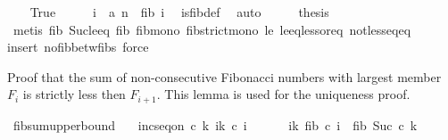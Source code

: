 \begin{isabellebody}
\ \ \isamarkupfalse%
\ True\isanewline
\ \ \isamarkupfalse%
\ \isamarkupfalse%
\ i\ \ a{\isacharcolon}{\kern0pt}\ {\isachardoublequoteopen}n\ {\isacharequal}{\kern0pt}\ fib\ i{\isachardoublequoteclose}\ \isamarkupfalse%
\ is{\isacharunderscore}{\kern0pt}fib{\isacharunderscore}{\kern0pt}def\ \isamarkupfalse%
\ auto\isanewline
\ \ \isamarkupfalse%
\ \isamarkupfalse%
\ {\isacharquery}{\kern0pt}thesis\isanewline
\ \ \ \ \isamarkupfalse%
\ {\isacharparenleft}{\kern0pt}metis\ fib{}\ Suc{\isacharunderscore}{\kern0pt}le{\isacharunderscore}{\kern0pt}eq\ fib{\isacharunderscore}{\kern0pt}{}\ fib{\isacharunderscore}{\kern0pt}mono\ fib{\isacharunderscore}{\kern0pt}strict{\isacharunderscore}{\kern0pt}mono\ le{}\ le{\isacharunderscore}{\kern0pt}eq{\isacharunderscore}{\kern0pt}less{\isacharunderscore}{\kern0pt}or{\isacharunderscore}{\kern0pt}eq\ not{\isacharunderscore}{\kern0pt}less{\isacharunderscore}{\kern0pt}eq{\isacharunderscore}{\kern0pt}eq{\isacharparenright}{\kern0pt}\isanewline
{}\isamarkupfalse%
{\isacharparenleft}{\kern0pt}insert\ no{\isacharunderscore}{\kern0pt}fib{\isacharunderscore}{\kern0pt}betw{\isacharunderscore}{\kern0pt}fibs{\isacharcomma}{\kern0pt}\ force{\isacharparenright}{\kern0pt}%
\endisatagproof
{\isafoldproof}%
%
\isadelimproof
%
\endisadelimproof
%
\begin{isamarkuptext}%
Proof that the sum of non-consecutive Fibonacci numbers with largest member $F_i$ is strictly
  less then $F_{i+1}$. This lemma is used for the uniqueness proof.%
\end{isamarkuptext}\isamarkuptrue%
\isamarkupfalse%
\ fib{\isacharunderscore}{\kern0pt}sum{\isacharunderscore}{\kern0pt}upper{\isacharunderscore}{\kern0pt}bound{\isacharcolon}{\kern0pt}\isanewline
\ \ \ {\isachardoublequoteopen}inc{\isacharunderscore}{\kern0pt}seq{\isacharunderscore}{\kern0pt}on\ c\ {\isacharbraceleft}{\kern0pt}{}{\isachardot}{\kern0pt}{\isachardot}{\kern0pt}k{\isacharminus}{\kern0pt}{}{\isacharbraceright}{\kern0pt}{\isachardoublequoteclose}\ {\isachardoublequoteopen}{\isasymforall}i{\isasymin}{\isacharbraceleft}{\kern0pt}{}{\isachardot}{\kern0pt}{\isachardot}{\kern0pt}k{\isacharbraceright}{\kern0pt}{\isachardot}{\kern0pt}\ c\ i\ {\isasymge}\ {}{\isachardoublequoteclose}\isanewline
\ \ \ {\isachardoublequoteopen}{\isacharparenleft}{\kern0pt}{\isasymSum}\ i{\isacharequal}{\kern0pt}{}{\isachardot}{\kern0pt}{\isachardot}{\kern0pt}k{\isachardot}{\kern0pt}\ fib\ {\isacharparenleft}{\kern0pt}c\ i{\isacharparenright}{\kern0pt}{\isacharparenright}{\kern0pt}\ {\isacharless}{\kern0pt}\ fib\ {\isacharparenleft}{\kern0pt}Suc\ {\isacharparenleft}{\kern0pt}c\ k{\isacharparenright}{\kern0pt}{\isacharparenright}{\kern0pt}{\isachardoublequoteclose}\isanewline

\end{isabellebody}
